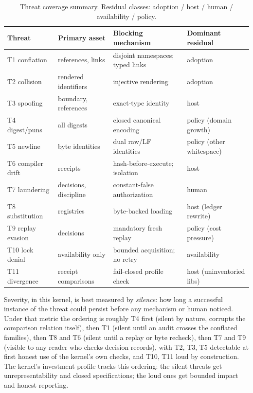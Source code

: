 \begin{table}[htbp]
\centering
\caption{Threat coverage summary. Residual classes: adoption / host / human / availability / policy.}
\label{threat:tab:coverage}
\begin{tabular}{@{}llll@{}}
\toprule
Threat & Primary asset & Blocking mechanism & Dominant residual \\
\midrule
T1 conflation & references, links & disjoint namespaces; typed links & adoption \\
T2 collision & rendered identifiers & injective rendering & adoption \\
T3 spoofing & boundary, references & exact-type identity & host \\
T4 digest/puns & all digests & closed canonical encoding & policy (domain growth) \\
T5 newline & byte identities & dual raw/LF identities & policy (other whitespace) \\
T6 compiler drift & receipts & hash-before-execute; isolation & host \\
T7 laundering & decisions, discipline & constant-false authorization & human \\
T8 substitution & registries & byte-backed loading & host (ledger rewrite) \\
T9 replay evasion & decisions & mandatory fresh replay & policy (cost pressure) \\
T10 lock denial & availability only & bounded acquisition; no retry & availability \\
T11 divergence & receipt comparisons & fail-closed profile check & host (uninventoried libs) \\
\bottomrule
\end{tabular}
\end{table}

Severity, in this kernel, is best measured by \emph{silence}: how long a successful instance of the threat could persist before any mechanism or human noticed. Under that metric the ordering is roughly T4 first (silent by nature, corrupts the comparison relation itself), then T1 (silent until an audit crosses the conflated families), then T8 and T6 (silent until a replay or byte recheck), then T7 and T9 (visible to any reader who checks decision records), with T2, T3, T5 detectable at first honest use of the kernel's own checks, and T10, T11 loud by construction. The kernel's investment profile tracks this ordering: the silent threats get unrepresentability and closed specifications; the loud ones get bounded impact and honest reporting.


